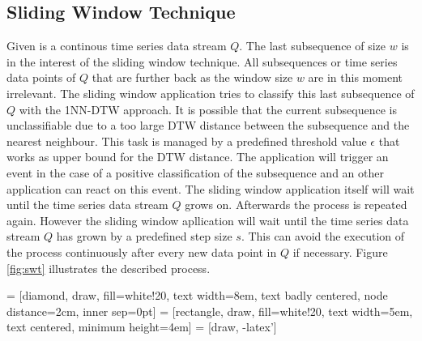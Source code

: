 \subsection{Sliding Window Technique} \label{sliding_window_technique}
Given is a continous time series data stream $Q$. The last subsequence of size $w$ is in the interest of the sliding
window technique. All subsequences or time series data points of $Q$ that are further back as the window size $w$ are in
this moment irrelevant. The sliding window application tries to classify this last subsequence of $Q$ with the 1NN-DTW
approach. It is possible that the current subsequence is unclassifiable due to a too large DTW distance between the
subsequence and the nearest neighbour. This task is managed by a predefined threshold value $\epsilon$ that works as
upper bound for the DTW distance. The application will trigger an event in the case of a positive classification of the
subsequence and an other application can react on this event. The sliding window application itself will wait until the
time series data stream $Q$ grows on. Afterwards the process is repeated again. However the sliding window apllication
will wait until the time series data stream $Q$ has grown by a predefined step size $s$. This can avoid the execution
of the process continuously after every new data point in $Q$ if necessary. Figure \ref{fig:swt} illustrates the
described process.

 = [diamond, draw, fill=white!20, text width=8em, text badly centered, node distance=2cm, inner sep=0pt]
 = [rectangle, draw, fill=white!20, text width=5em, text centered, minimum height=4em]
 = [draw, -latex']

